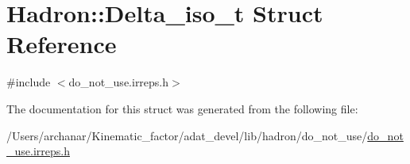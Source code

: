 \hypertarget{structHadron_1_1Delta__iso__t}{}\section{Hadron\+:\+:Delta\+\_\+iso\+\_\+t Struct Reference}
\label{structHadron_1_1Delta__iso__t}


{\ttfamily \#include $<$do\+\_\+not\+\_\+use.\+irreps.\+h$>$}



The documentation for this struct was generated from the following file\+:\begin{DoxyCompactItemize}
\item 
/\+Users/archanar/\+Kinematic\+\_\+factor/adat\+\_\+devel/lib/hadron/do\+\_\+not\+\_\+use/\mbox{\hyperlink{do__not__use_8irreps_8h}{do\+\_\+not\+\_\+use.\+irreps.\+h}}\end{DoxyCompactItemize}
